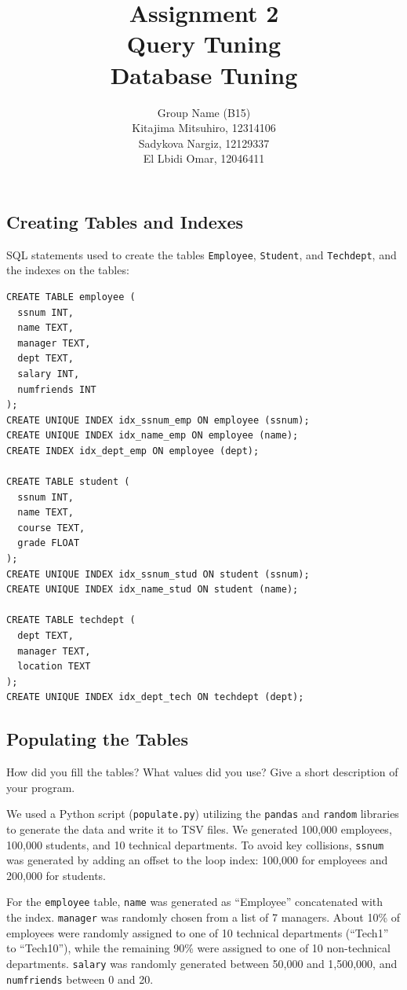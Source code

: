 \documentclass[11pt]{scrartcl}
\title{
  \textbf{\large Assignment 2} \\
  Query Tuning \\
  {\large Database Tuning}
}
\author{
  Group Name (B15) \\
  \large Kitajima Mitsuhiro, 12314106 \\
  \large Sadykova Nargiz, 12129337 \\
  \large El Lbidi Omar, 12046411 \\
}
\begin{document}
\maketitle\thispagestyle{empty}

\subsection*{Creating Tables and Indexes}

SQL statements used to create the tables \texttt{Employee}, \texttt{Student}, and \texttt{Techdept}, and the indexes on the tables:

\begin{lstlisting}[style=dbtsql]
CREATE TABLE employee (
  ssnum INT, 
  name TEXT, 
  manager TEXT, 
  dept TEXT, 
  salary INT, 
  numfriends INT
);
CREATE UNIQUE INDEX idx_ssnum_emp ON employee (ssnum);
CREATE UNIQUE INDEX idx_name_emp ON employee (name);
CREATE INDEX idx_dept_emp ON employee (dept);

CREATE TABLE student (
  ssnum INT,
  name TEXT,
  course TEXT,
  grade FLOAT
);
CREATE UNIQUE INDEX idx_ssnum_stud ON student (ssnum);
CREATE UNIQUE INDEX idx_name_stud ON student (name);

CREATE TABLE techdept (
  dept TEXT,
  manager TEXT,
  location TEXT
);
CREATE UNIQUE INDEX idx_dept_tech ON techdept (dept);
\end{lstlisting}

\subsection*{Populating the Tables}

How did you fill the tables? What values did you use? Give a short description of your program.

We used a Python script (\texttt{populate.py}) utilizing the \texttt{pandas} and \texttt{random} libraries to generate the data and write it to TSV files. We generated 100,000 employees, 100,000 students, and 10 technical departments. To avoid key collisions, \texttt{ssnum} was generated by adding an offset to the loop index: 100,000 for employees and 200,000 for students. 

For the \texttt{employee} table, \texttt{name} was generated as ``Employee'' concatenated with the index. \texttt{manager} was randomly chosen from a list of 7 managers. About 10\% of employees were randomly assigned to one of 10 technical departments (``Tech1'' to ``Tech10''), while the remaining 90\% were assigned to one of 10 non-technical departments. \texttt{salary} was randomly generated between 50,000 and 1,500,000, and \texttt{numfriends} between 0 and 20.
\end{document}
